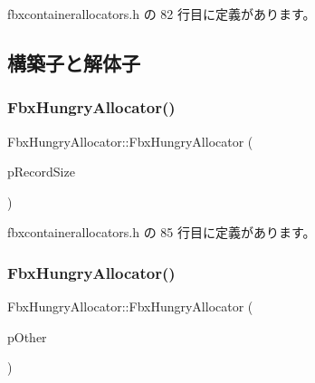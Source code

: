  fbxcontainerallocators.\+h の 82 行目に定義があります。



\subsection{構築子と解体子}
\mbox{\label{class_fbx_hungry_allocator_a194f8edf036580f3652dcbd84f09c5c2}} 
\subsubsection{\texorpdfstring{Fbx\+Hungry\+Allocator()}{FbxHungryAllocator()}\hspace{0.1cm}{\footnotesize\ttfamily [1/2]}}
{\footnotesize\ttfamily Fbx\+Hungry\+Allocator\+::\+Fbx\+Hungry\+Allocator (\begin{DoxyParamCaption}\item[{size\+\_\+t}]{p\+Record\+Size }\end{DoxyParamCaption})\hspace{0.3cm}{\ttfamily [inline]}}



 fbxcontainerallocators.\+h の 85 行目に定義があります。

\mbox{\label{class_fbx_hungry_allocator_aa97f29518f4a71ac45f0784f6a4c66b7}} 
\subsubsection{\texorpdfstring{Fbx\+Hungry\+Allocator()}{FbxHungryAllocator()}\hspace{0.1cm}{\footnotesize\ttfamily [2/2]}}
{\footnotesize\ttfamily Fbx\+Hungry\+Allocator\+::\+Fbx\+Hungry\+Allocator (\begin{DoxyParamCaption}\item[{const \hyperlink{class_fbx_hungry_allocator}{Fbx\+Hungry\+Allocator} \&}]{p\+Other }\end{DoxyParamCaption})\hspace{0.3cm}{\ttfamily [inline]}}



